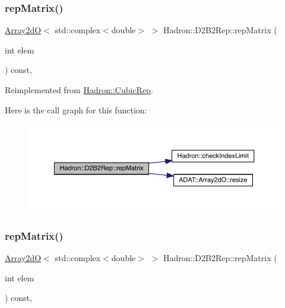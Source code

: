 \subsubsection{\texorpdfstring{repMatrix()}{repMatrix()}\hspace{0.1cm}{\footnotesize\ttfamily [1/2]}}
{\footnotesize\ttfamily \mbox{\hyperlink{classADAT_1_1Array2dO}{Array2dO}}$<$ std\+::complex$<$double$>$ $>$ Hadron\+::\+D2\+B2\+Rep\+::rep\+Matrix (\begin{DoxyParamCaption}\item[{int}]{elem }\end{DoxyParamCaption}) const\hspace{0.3cm}{\ttfamily [inline]}, {\ttfamily [virtual]}}



Reimplemented from \mbox{\hyperlink{structHadron_1_1CubicRep_ac5d7e9e6f4ab1158b5fce3e4ad9e8005}{Hadron\+::\+Cubic\+Rep}}.

Here is the call graph for this function\+:
\nopagebreak
\begin{figure}[H]
\begin{center}
\leavevmode
\includegraphics[width=350pt]{d3/dbb/structHadron_1_1D2B2Rep_a0e46bb79c1d9429a207f9f82eef59450_cgraph}
\end{center}
\end{figure}
\mbox{\label{structHadron_1_1D2B2Rep_a0e46bb79c1d9429a207f9f82eef59450}} 
\subsubsection{\texorpdfstring{repMatrix()}{repMatrix()}\hspace{0.1cm}{\footnotesize\ttfamily [2/2]}}
{\footnotesize\ttfamily \mbox{\hyperlink{classADAT_1_1Array2dO}{Array2dO}}$<$ std\+::complex$<$double$>$ $>$ Hadron\+::\+D2\+B2\+Rep\+::rep\+Matrix (\begin{DoxyParamCaption}\item[{int}]{elem }\end{DoxyParamCaption}) const\hspace{0.3cm}{\ttfamily [inline]}, {\ttfamily [virtual]}}



